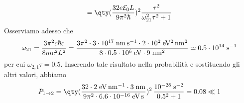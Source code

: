 \begin{soluzione}
\begin{equation*}
      =\qty( \frac{32 e \mathcal{E}_0 L}{9 \pi^2 \hbar} )^2 \frac{\tau^2}{\omega_{21}^2 \tau^2 + 1}
   \end{equation*}
   Osserviamo adesso che
   \begin{equation*}
      \omega_{21}
      =\frac{3 \pi^2 c \hbar c}{8 mc^2 L^2}
      =\frac{3 \pi^2 \cdot 3 \cdot 10^{17} \; \rm nm \, s^{-1} \cdot 2 \cdot 10^2 \; eV^2 \, nm^2}{8 \cdot 0.5 \cdot 10^6 \; \rm eV \cdot 9 \; \rm nm^2}
      \simeq 0.5 \cdot 10^{14} \; \rm s^{-1}
   \end{equation*}
   per cui $\omega_{2,1}\tau=0.5$. Inserendo tale risultato nella probabilità e sostituendo gli altri valori, abbiamo
   \begin{equation*}
      P_{1 \to 2}
      =\rm \qty( \frac{32 \cdot 2 \; eV \, nm^{-1} \cdot 3 \; nm}{9 \pi^2 \cdot 6.6 \cdot 10^{-16} \; eV \, s} )^2 \, \frac{10^{-28} \; s^{-2}}{0.5^2 + 1}
      =0.08 \ll 1
   \end{equation*}
\end{soluzione}

\newpage
\setcounter{equation}{0}